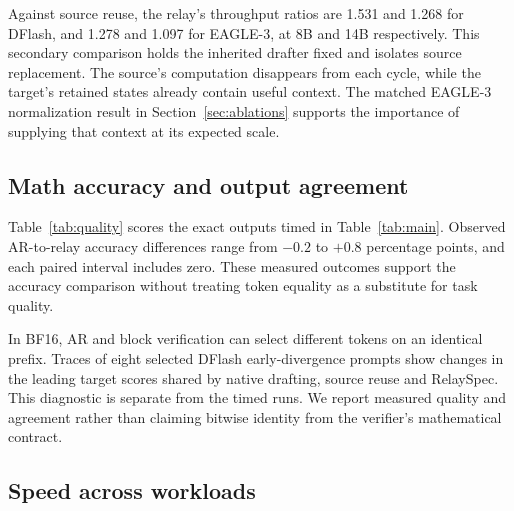 \documentclass{article}
\begin{document}
\begin{table}[H]
\caption{Native throughput retained and mean recorded progress per cycle.
N and R denote native drafting and RelaySpec. Progress includes the
implementation's target-supplied token.}
\label{tab:retention}
\centering\small
\setlength{\tabcolsep}{4pt}

\end{table}

Against source reuse, the relay's throughput ratios are 1.531 and 1.268
for DFlash, and 1.278 and 1.097 for EAGLE-3, at 8B and 14B respectively.
This secondary comparison holds the inherited drafter fixed and isolates
source replacement. The source's computation disappears from each cycle,
while the target's retained states already contain useful context.
The matched EAGLE-3 normalization result in Section~\ref{sec:ablations}
supports the importance of supplying that context at its expected scale.

\subsection{Math accuracy and output agreement}

Table~\ref{tab:quality} scores the exact outputs timed in Table~\ref{tab:main}.
Observed AR-to-relay accuracy differences range from $-0.2$ to $+0.8$
percentage points, and each paired interval includes zero. These measured
outcomes support the accuracy comparison without treating token equality
as a substitute for task quality.

\begin{table}[H]
\caption{MATH-500 accuracy in percent. Difference is RelaySpec minus AR
in percentage points. Token matches count identical full output sequences.}
\label{tab:quality}
\centering\small
\setlength{\tabcolsep}{4pt}

\end{table}

In BF16, AR and block verification can select different tokens on an
identical prefix. Traces of eight selected DFlash early-divergence prompts show
changes in the leading target scores shared by native drafting, source
reuse and RelaySpec. This diagnostic is separate from the timed runs.
We report measured quality and agreement rather than claiming bitwise
identity from the verifier's mathematical contract.

\subsection{Speed across workloads}
\end{document}
